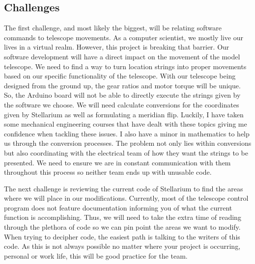 \documentclass[12pt]{report}
\begin{document}
\subsection*{Challenges}

The first challenge, and most likely the biggest, will be relating software commands to telescope movements. As a computer scientist, we mostly live our lives in a virtual realm. However, this project is breaking that barrier. Our software development will have a direct impact on the movement of the model telescope. We need to find a way to turn location strings into proper movements based on our specific functionality of the telescope. With our telescope being designed from the ground up, the gear ratios and motor torque will be unique. So, the Arduino board will not be able to directly execute the strings given by the software we choose. We will need calculate conversions for the coordinates given by Stellarium as well as formulating a meridian flip. Luckily, I have taken some mechanical engineering courses that have dealt with these topics giving me confidence when tackling these issues. I also have a minor in mathematics to help us through the conversion processes. The problem not only lies within conversions but also coordinating with the electrical team of how they want the strings to be presented. We need to ensure we are in constant communication with them throughout this process so neither team ends up with unusable code.

The next challenge is reviewing the current code of Stellarium to find the areas where we will place in our modifications. Currently, most of the telescope control program does not feature documentation informing you of what the current function is accomplishing. Thus, we will need to take the extra time of reading through the plethora of code so we can pin point the areas we want to modify. When trying to decipher code, the easiest path is talking to the writers of this code. As this is not always possible no matter where your project is occurring, personal or work life, this will be good practice for the team.
\end{document}
